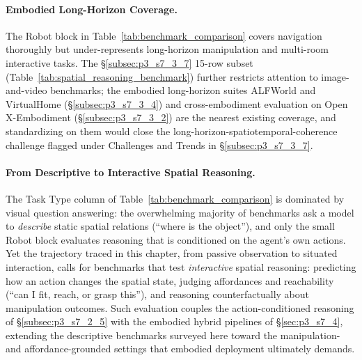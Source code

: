 \paragraph{Embodied Long-Horizon Coverage.}
The Robot block in Table~\ref{tab:benchmark_comparison} covers navigation thoroughly but under-represents long-horizon manipulation and multi-room interactive tasks. 
The §\ref{subsec:p3_s7_3_7} 15-row subset (Table~\ref{tab:spatial_reasoning_benchmark}) further restricts attention to image-and-video benchmarks; the embodied long-horizon suites ALFWorld and VirtualHome (§\ref{subsec:p3_s7_3_4}) and cross-embodiment evaluation on Open X-Embodiment (§\ref{subsec:p3_s7_3_2}) are the nearest existing coverage, and standardizing on them would close the long-horizon-spatiotemporal-coherence challenge flagged under Challenges and Trends in §\ref{subsec:p3_s7_3_7}.

\paragraph{From Descriptive to Interactive Spatial Reasoning.}
The Task Type column of Table~\ref{tab:benchmark_comparison} is dominated by visual question answering: the overwhelming majority of benchmarks ask a model to \emph{describe} static spatial relations (``where is the object''), and only the small Robot block evaluates reasoning that is conditioned on the agent's own actions.
Yet the trajectory traced in this chapter, from passive observation to situated interaction, calls for benchmarks that test \emph{interactive} spatial reasoning: predicting how an action changes the spatial state, judging affordances and reachability (``can I fit, reach, or grasp this''), and reasoning counterfactually about manipulation outcomes.
Such evaluation couples the action-conditioned reasoning of §\ref{subsec:p3_s7_2_5} with the embodied hybrid pipelines of §\ref{sec:p3_s7_4}, extending the descriptive benchmarks surveyed here toward the manipulation- and affordance-grounded settings that embodied deployment ultimately demands.
